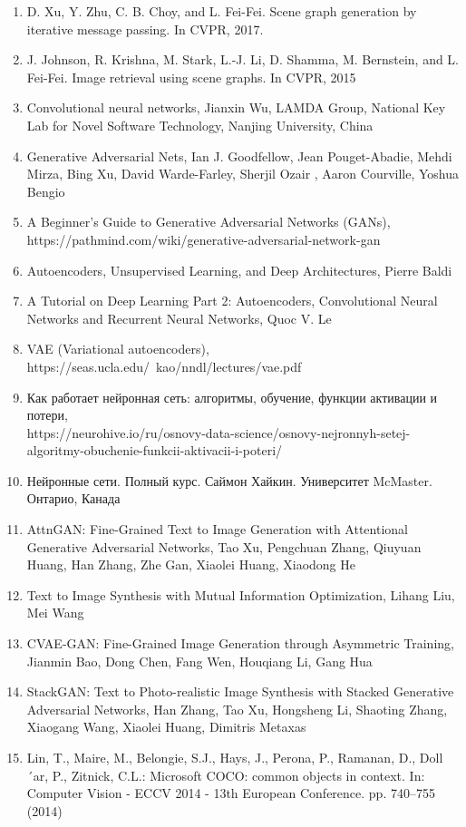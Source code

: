 \documentclass{article}
\begin{document}
      \begin{enumerate} 
\item D. Xu, Y. Zhu, C. B. Choy, and L. Fei-Fei. Scene graph
generation by iterative message passing. In CVPR, 2017.
\item J. Johnson, R. Krishna, M. Stark, L.-J. Li, D. Shamma,
M. Bernstein, and L. Fei-Fei. Image retrieval using scene
graphs. In CVPR, 2015
\item Convolutional neural networks, Jianxin Wu, LAMDA Group, National Key Lab for Novel Software Technology, Nanjing University, China
\item Generative Adversarial Nets, Ian J. Goodfellow, Jean Pouget-Abadie, Mehdi Mirza, Bing Xu, David Warde-Farley, Sherjil Ozair
, Aaron Courville, Yoshua Bengio
\item A Beginner's Guide to Generative Adversarial Networks (GANs),  https://pathmind.com/wiki/generative-adversarial-network-gan
\item Autoencoders, Unsupervised Learning, and Deep Architectures, Pierre Baldi 
\item A Tutorial on Deep Learning Part 2: Autoencoders, Convolutional Neural Networks and Recurrent Neural Networks, Quoc V. Le
\item VAE (Variational autoencoders), \\https://seas.ucla.edu/~kao/nndl/lectures/vae.pdf
\item Как работает нейронная сеть: алгоритмы, обучение, функции активации и потери, \\ https://neurohive.io/ru/osnovy-data-science/osnovy-nejronnyh-setej-algoritmy-obuchenie-funkcii-aktivacii-i-poteri/ 
\item Нейронные сети. Полный курс. Саймон Хайкин. Университет McMaster. Онтарио, Канада
\item AttnGAN: Fine-Grained Text to Image Generation
with Attentional Generative Adversarial Networks,
      Tao Xu, Pengchuan Zhang, Qiuyuan Huang, Han Zhang, Zhe Gan, Xiaolei Huang, Xiaodong He
\item Text to Image Synthesis with Mutual Information Optimization, Lihang Liu, Mei Wang 
\item CVAE-GAN: Fine-Grained Image Generation through Asymmetric Training, Jianmin Bao, Dong Chen, Fang Wen, Houqiang Li, Gang Hua
\item StackGAN: Text to Photo-realistic Image Synthesis with Stacked Generative Adversarial Networks, Han Zhang, Tao Xu, Hongsheng Li, Shaoting Zhang, Xiaogang Wang, Xiaolei Huang, Dimitris Metaxas
\item Lin, T., Maire, M., Belongie, S.J., Hays, J., Perona, P., Ramanan, D., Doll´ar, P., Zitnick, C.L.: Microsoft COCO: common objects in context. In: Computer Vision - ECCV 2014 - 13th European Conference. pp. 740–755 (2014)

\end{enumerate}
\end{document}
